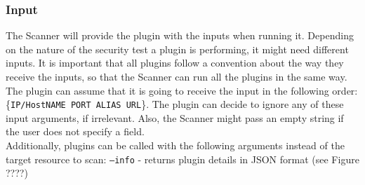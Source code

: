 \subsubsection{Input}
The Scanner will provide the plugin with the inputs when running it. Depending on the nature of the security test a plugin is performing, it might need different inputs. It is important that all plugins follow a convention about the way they receive the inputs, so that the Scanner can run all the plugins in the same way. The plugin can assume that it is going to receive the input in the following order: \{\texttt{IP/HostNAME PORT ALIAS URL}\}. The plugin can decide to ignore any of these input arguments, if irrelevant. Also, the Scanner might pass an empty string if the user does not specify a field.
\\
Additionally, plugins can be called with the following arguments instead of the target resource to scan:
\texttt{--info} - returns plugin details in JSON format (see Figure ????)  
